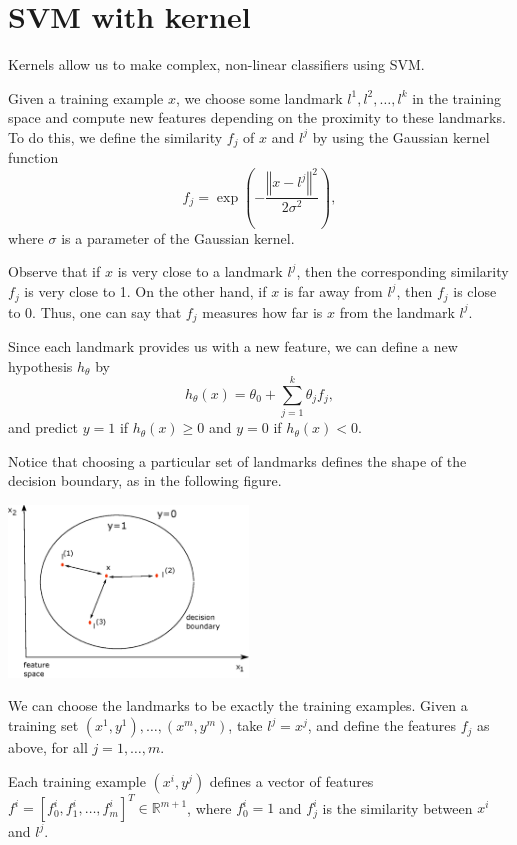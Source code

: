 \documentclass[a4paper,11pt]{report}
\newcommand{\norm}[1]{\left\Vert#1\right\Vert}
\newcommand{\ds}{\displaystyle}
\begin{document}
\section{SVM with kernel}

Kernels allow us to make complex, non-linear classifiers using SVM.

Given a training example $x$, we choose some landmark $l^{1}, l^{2}, \ldots, l^{k}$ in the training space and compute new features depending on the proximity to these landmarks. To do this, we define the similarity $f_j$ of $x$ and $l^{j}$ by using the Gaussian kernel function
$$f_j = \ds\exp\left(-\frac{\norm{x - l^{j}}^2}{2\sigma^2}\right),$$
where $\sigma$ is a parameter of the Gaussian kernel.

Observe that if $x$ is very close to a landmark $l^{j}$, then the corresponding similarity $f_j$ is very close to 1. On the other hand, if $x$ is far away from $l^{j}$, then $f_j$ is close to 0. Thus, one can say that $f_j$ measures how far is $x$ from the landmark $l^{j}$.

Since each landmark provides us with a new feature, we can define a new hypothesis $h_\theta$ by
$$h_\theta(x) = \theta_0 + \ds\sum_{j=1}^{k}{\theta_j f_j},$$
and predict $y=1$ if $h_\theta(x) \ge 0$ and $y=0$ if $h_\theta(x) < 0$.

Notice that choosing a particular set of landmarks defines the shape of the decision boundary, as in the following figure.

\hspace{1.0in}
\begin{center}
\includegraphics[height = 1.8in]{Images/kernel}
\end{center}

We can choose the landmarks to be exactly the training examples. Given a training set $(x^1, y^1), \ldots, (x^m, y^m)$, take $l^{j} = x^j$, and define the features $f_j$ as above, for all $j=1, \ldots, m$.

Each training example $(x^i, y^j)$ defines a vector of features $f^i = [f^i_0, f^i_1, \ldots, f^i_m]^T \in \mathbb{R}^{m+1}$, where $f^i_0 = 1$ and $f^i_j$ is the similarity between $x^i$ and $l^j$.
\end{document}
